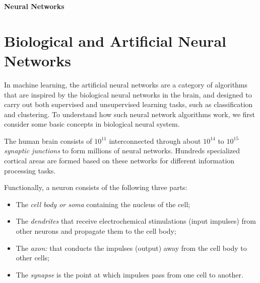 \documentclass{article}
\begin{document}
{\bf\Large Neural Networks}

\section{Biological and Artificial Neural Networks}

In machine learning, the artificial neural networks are a category 
of algorithms that are inspired by the biological neural networks in 
the brain, and designed to carry out both supervised and unsupervised 
learning tasks, such as classification and clustering. To understand 
how such neural network algorithms work, we first consider some basic 
concepts in biological neural system.

The human brain consists of $10^{11}$ 
interconnected through about $10^{14}$ to $10^{15}$ {\em synaptic junctions} 
to form millions of neural networks. Hundreds specialized cortical areas 
are formed based on these networks for different information processing 
tasks. 

Functionally, a neuron consists of the following three parts:
\begin{itemize}
\item The {\em cell body or soma} containing the nucleus of the cell;
\item The {\em dendrites} that receive electrochemical stimulations
  (input impulses) from other neurons and propagate them to the cell
  body;
\item The {\em axon:} that conducts the impulses (output) away from
  the cell body to other cells; 
\item The {\em synapse} is the point at which impulses pass from one 
  cell to another.
\end{itemize}

\end{document}

